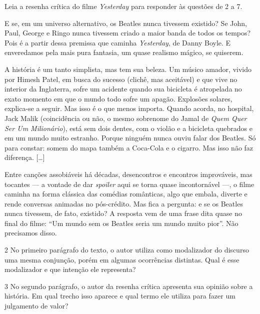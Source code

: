 Leia a resenha crítica do filme \emph{Yesterday} para responder às questões
de 2 a 7.


\begin{myquote}
E se, em um universo alternativo, os Beatles nunca tivessem existido? Se
John, Paul, George e Ringo nunca tivessem criado a maior banda de todos
os tempos? Pois é a partir dessa premissa que caminha \emph{Yesterday},
de Danny Boyle. E enveredamos pela mais pura fantasia, um quase realismo
mágico, se quiserem.

A história é um tanto simplista, mas tem sua beleza. Um músico amador,
vivido por Himesh Patel, em busca do sucesso (clichê, mas aceitável) e
que vive no interior da Inglaterra, sofre um acidente quando sua
bicicleta é atropelada no exato momento em que o mundo todo sofre um
apagão. Explosões solares, explica-se a seguir. Mas isso é o que menos
importa. Quando acorda, no hospital, Jack Malik (coincidência ou não, o
mesmo sobrenome do Jamal de \emph{Quem Quer Ser Um Milionário}), está
sem dois dentes, com o violão e a bicicleta quebrados e em um mundo
muito estranho. Porque ninguém nunca ouviu falar dos Beatles. Só para
constar: somem do mapa também a Coca-Cola e o cigarro. Mas isso não faz
diferença. {[}\ldots{}{]}

Entre canções assobiáveis há décadas, desencontros e encontros
improváveis, mas tocantes — a vontade de dar \emph{spoiler} aqui se
torna quase incontornável —, o filme caminha na forma clássica das
comédias românticas, algo que embala, diverte e rende conversas animadas
no pós-crédito. Mas fica a pergunta: e se os Beatles nunca tivessem, de
fato, existido? A resposta vem de uma frase dita quase no final do
filme: ``Um mundo sem os Beatles seria um mundo muito pior''. Não
precisamos disso.

\end{myquote}

\num{2} No primeiro parágrafo do texto, o autor utiliza como modalizador
do discurso uma mesma conjunção, porém em algumas ocorrências distintas.
Qual é esse modalizador e que intenção ele representa?


\num{3} No segundo parágrafo, o autor da resenha crítica apresenta sua
opinião sobre a história. Em qual trecho isso aparece e qual termo ele
utiliza para fazer um julgamento de valor?

